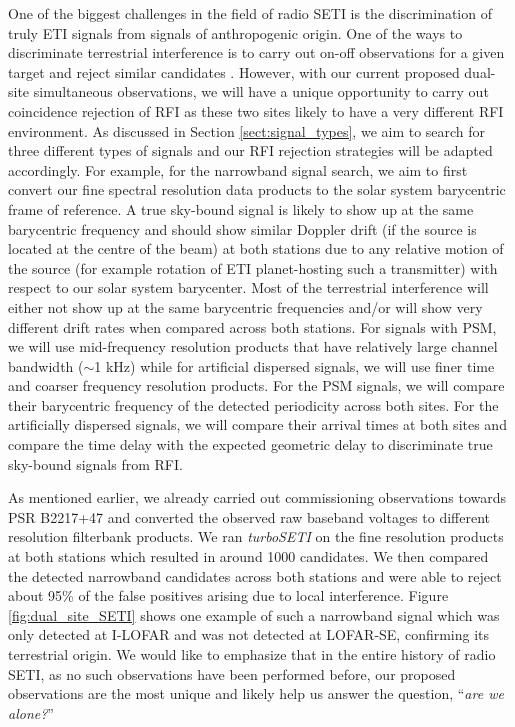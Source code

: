 \documentclass{aastex63}
\begin{document}
One of the biggest challenges in the field of radio SETI is the discrimination of truly ETI signals from signals of anthropogenic origin. One of the ways to discriminate terrestrial interference is to carry out on-off observations for a given target and reject similar candidates \citep{Enriquez:2017}. However, with our current proposed dual-site simultaneous observations, we will have a unique opportunity to carry out coincidence rejection of RFI as these two sites likely to have a very different RFI environment. As discussed in Section \ref{sect:signal_types}, we aim to search for three different types of signals and our RFI rejection strategies will be adapted accordingly. For example, for the narrowband signal search, we aim to first convert our fine spectral resolution data products to the solar system barycentric frame of reference. A true sky-bound signal is likely to show up at the same barycentric frequency and should show similar Doppler drift (if the source is located at the centre of the beam) at both stations due to any relative motion of the source (for example rotation of ETI planet-hosting such a transmitter) with respect to our solar system barycenter. Most of the terrestrial interference will either not show up at the same barycentric frequencies and/or will show very different drift rates when compared across both stations. For signals with PSM, we will use mid-frequency resolution products that have relatively large channel bandwidth ($\sim$1 kHz) while for artificial dispersed signals, we will use finer time and coarser frequency resolution products. For the PSM signals, we will compare their barycentric frequency of the detected periodicity across both sites. For the artificially dispersed signals, we will compare their arrival times at both sites and compare the time delay with the expected geometric delay to discriminate true sky-bound signals from RFI. 

As mentioned earlier, we already carried out commissioning observations towards PSR B2217+47 and converted the observed raw baseband voltages to different resolution filterbank products. We ran {\itshape turboSETI} on the fine resolution products at both stations which resulted in around 1000 candidates. We then compared the detected narrowband candidates across both stations and were able to reject about 95\% of the false positives arising due to local interference. Figure \ref{fig:dual_site_SETI} shows one example of such a narrowband signal which was only detected at I-LOFAR and was not detected at LOFAR-SE, confirming its terrestrial origin. We would like to emphasize that in the entire history of radio SETI, as no such observations have been performed before, our proposed observations are the most unique and likely help us answer the question, “{\itshape are we alone?}”
\end{document}
